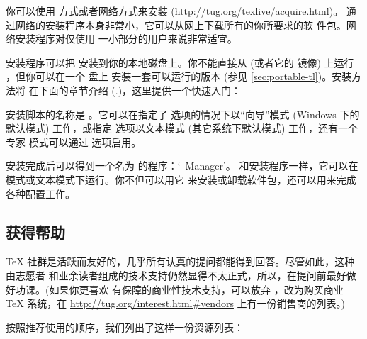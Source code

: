 \documentclass{article}
\begin{document}
你可以使用 \DVD{} 方式或者网络方式来安装 \TL{}
(\url{http://tug.org/texlive/acquire.html})。
通过网络的安装程序本身非常小，它可以从网上下载所有的你所要求的软
件包。网络安装程序对仅使用 \TL{} 一小部分的用户来说非常适宜。

\DVD{} 安装程序可以把 \TL{} 安装到你的本地磁盘上。你不能直接从 \TK{}
\DVD{} (或者它的  镜像) 上运行 \TL{}，但你可以在一个 \USB{} 盘上
安装一套可以运行的版本 (参见 \ref{sec:portable-tl})。安装方法将
在下面的章节介绍 (\p.\pageref{sec:install})，这里提供一个快速入门：

\begin{itemize*}

\item 安装脚本的名称是 。它可以在指定了
 选项的情况下以“向导”模式 (Windows 下的默认模式)
工作，或指定  选项以文本模式 (其它系统下默认模式)
工作，还有一个专家 \GUI{} 模式可以通过  选项启用。

\item 安装完成后可以得到一个名为  的程序：`\TL\ Manager'。
和安装程序一样，它可以在 \GUI{} 模式或文本模式下运行。你不但可以用它
来安装或卸载软件包，还可以用来完成各种配置工作。

\end{itemize*}


\subsection{获得帮助}
\label{sec:help}

\TeX{} 社群是活跃而友好的，几乎所有认真的提问都能得到回答。尽管如此，这种由志愿者
和业余读者组成的技术支持仍然显得不太正式，所以，在提问前最好做好功课。(如果你更喜欢
有保障的商业性技术支持，可以放弃 \TL{}，改为购买商业 \TeX{} 系统，在
\url{http://tug.org/interest.html#vendors} 上有一份销售商的列表。)

按照推荐使用的顺序，我们列出了这样一份资源列表：
\end{document}
